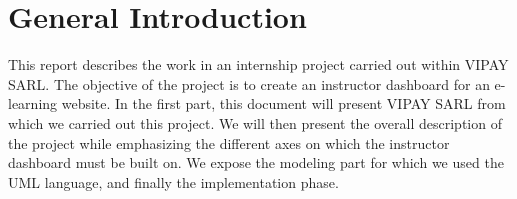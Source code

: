 \chapter*{General Introduction}
This report describes the work in an internship project carried out within VIPAY SARL.
The objective of the project is to create an instructor dashboard for an e-learning website.
\hfill \break
\hfill \break
In the first part, this document will present VIPAY SARL from which we carried out this project. We will then present the overall description of the project
while emphasizing the different axes on which the instructor dashboard must be
built on. We expose the modeling part for which we used the UML language, and
finally the implementation phase.